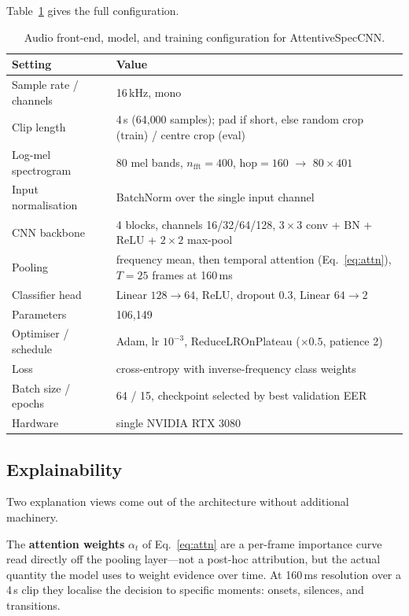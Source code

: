 \documentclass[sn-mathphys-num,pdflatex]{sn-jnl}
\begin{document}
Table~\ref{tab:config} gives the full configuration.

\begin{table}[t]
\centering
\caption{Audio front-end, model, and training configuration for AttentiveSpecCNN.}
\label{tab:config}
\begin{tabular}{@{}lp{}@{}}
\toprule
Setting & Value \\
\midrule
Sample rate / channels & 16\,kHz, mono \\
Clip length            & 4\,s (64{,}000 samples); pad if short, else random crop (train) / centre crop (eval) \\
Log-mel spectrogram    & 80 mel bands, $n_\text{fft}{=}400$, hop${=}160$ $\rightarrow$ $80{\times}401$ \\
Input normalisation    & BatchNorm over the single input channel \\
CNN backbone           & 4 blocks, channels 16/32/64/128, $3{\times}3$ conv + BN + ReLU + $2{\times}2$ max-pool \\
Pooling                & frequency mean, then temporal attention (Eq.~\eqref{eq:attn}), $T{=}25$ frames at 160\,ms \\
Classifier head        & Linear $128{\to}64$, ReLU, dropout 0.3, Linear $64{\to}2$ \\
Parameters             & 106{,}149 \\
Optimiser / schedule   & Adam, lr $10^{-3}$, ReduceLROnPlateau ($\times 0.5$, patience 2) \\
Loss                   & cross-entropy with inverse-frequency class weights \\
Batch size / epochs    & 64 / 15, checkpoint selected by best validation EER \\
Hardware               & single NVIDIA RTX 3080 \\
\bottomrule
\end{tabular}
\end{table}

\subsection{Explainability}\label{sec:explain}

Two explanation views come out of the architecture without additional
machinery.

The \textbf{attention weights} $\alpha_t$ of Eq.~\eqref{eq:attn} are a per-frame
importance curve read directly off the pooling layer---not a post-hoc
attribution, but the actual quantity the model uses to weight evidence over
time. At 160\,ms resolution over a 4\,s clip they localise the decision to
specific moments: onsets, silences, and transitions.
\end{document}
